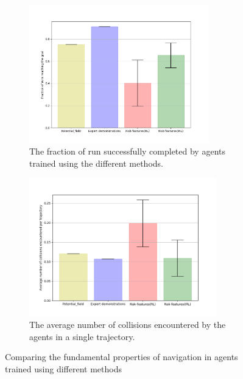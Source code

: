\begin{figure}[htbp]
    \begin{subfigure}{0.5\textwidth}
        \centering
        \includegraphics[width=0.95\linewidth, height=6cm]{plots/plot_without_outliers/ucy_inter_method_no_outlier/goal_reached_ucy_no_outlier_inter_method.png}
        \caption{The fraction of run successfully completed by agents trained using the different methods.}
        \label{fig:inter_method-goal_reached}
    \end{subfigure}
        \begin{subfigure}{0.5\textwidth}
            \centering
        \includegraphics[width=0.95\linewidth, height=6cm]{plots/plot_without_outliers/ucy_inter_method_no_outlier/count_collisions_ucy_no_outlier_inter_method.png}
        \caption{The average number of collisions encountered by the agents in a single trajectory.}
        \label{fig:inter_method-collision_counts}
    \end{subfigure}
\caption{Comparing the fundamental properties of navigation in agents trained using different methods}
\end{figure}\\

